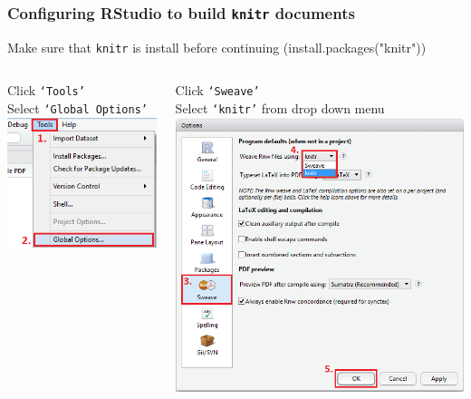 \documentclass{beamer}\usepackage[]{graphicx}\usepackage[]{color}
\begin{document}
\begin{frame}[fragile]
\frametitle{Configuring RStudio to build \texttt{knitr} documents}
 Make sure that \texttt{knitr} is install before continuing (install.packages("knitr"))
\begin{columns}[t]
\centering
\begin{block}{Click \texttt{`Tools'} \\ Select \texttt{`Global Options'}}
\centering
\includegraphics[scale=0.5]{img/configrstudio_opt.png}
\end{block}
\centering
\begin{block}{Click \texttt{`Sweave'} \\ Select \texttt{`knitr'} from drop down menu}
\centering
\includegraphics[scale=0.34]{img/set_to_knitr.png}
\end{block}
\end{columns}
\end{frame}
\end{document}
